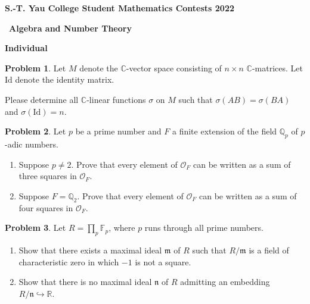 \documentclass[a4paper,12pt,leqno]{article}
\theoremstyle{definition}
\newtheorem{prob}{Problem}
\newcommand{\C}{\mathbb{C}}
\newcommand{\FF}{\mathbb{F}}
\newcommand{\RR}{\mathbb{R}}
\newcommand{\fm}{\mathfrak{m}}
\newcommand{\fn}{\mathfrak{n}}
\begin{document}
\begin{center}
  {\bf S.-T. Yau College Student Mathematics Contests 2022}

  \
 {\bf Algebra and Number Theory}
 
 {\bf Individual}
\end{center}

\begin{prob}
Let $M$ denote the $\C$-vector space consisting of $n\times n$
$\C$-matrices. Let $\mathrm{Id}$ denote the identity matrix.

Please determine all $\C$-linear functions $\sigma$ on $M$ such
that $\sigma(AB)=\sigma(BA)$ and $\sigma(\mathrm{Id})=n$.
\end{prob}

 \medskip




\begin{prob} Let $p$ be a prime number and $F$ a finite extension of the field $\mathbb{Q}_p$ of $p$-adic numbers.

\begin{enumerate}
  \item Suppose $p\neq 2$. Prove that every element of  $\mathcal{O}_F$ can be written as a sum of three squares in $\mathcal{O}_F$.
  \item Suppose $F=\mathbb{Q}_2$. Prove that every element of  $\mathcal{O}_F$ can be written as a sum of four squares in  $\mathcal{O}_F$.
\end{enumerate}

\end{prob}

\medskip

\begin{prob}
Let $R=\prod_p \FF_p$, where $p$ runs through all prime numbers.
\begin{enumerate}
\item Show that there exists a maximal ideal $\fm$ of $R$ such that
    $R/\fm$ is a field of characteristic zero in which $-1$ is not a
    square.
\item Show that there is no maximal ideal $\fn$ of $R$ admitting an
    embedding $R/\fn\hookrightarrow \RR$.
\end{enumerate}
\end{prob}
\end{document}
